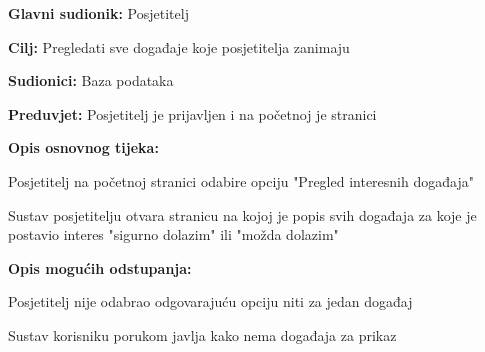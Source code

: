 					\noindent {}
\begin{packed_item}
	\item \textbf{Glavni sudionik:} Posjetitelj
	\item  \textbf{Cilj:} Pregledati sve događaje koje posjetitelja zanimaju
	\item  \textbf{Sudionici:} Baza podataka
	\item  \textbf{Preduvjet:} Posjetitelj je prijavljen i na početnoj je stranici
	\item  \textbf{Opis osnovnog tijeka:}
	
	\item[] \begin{packed_enum}
		
		\item Posjetitelj na početnoj stranici odabire opciju "Pregled interesnih događaja"
		\item Sustav posjetitelju otvara stranicu na kojoj je popis svih događaja za koje je postavio interes "sigurno dolazim" ili "možda dolazim"
	\end{packed_enum}
	
	\item  \textbf{Opis mogućih odstupanja:}
	
	\item[] \begin{packed_item}
		
		\item[2.a] Posjetitelj nije odabrao odgovarajuću opciju niti za jedan događaj
		\item[] \begin{packed_enum}
			
			\item Sustav korisniku porukom javlja kako nema događaja za prikaz
			
		\end{packed_enum}
	\end{packed_item}
\end{packed_item}

